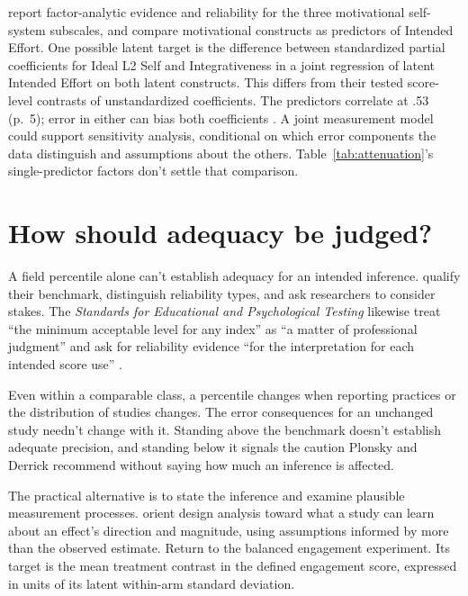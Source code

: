 \documentclass[12pt,twoside]{article}
\begin{document}
\textcite[pp.\ 4--6]{PapiSongSoliman2026} report factor-analytic evidence and reliability for the three motivational self-system subscales, and compare motivational constructs as predictors of Intended Effort. One possible latent target is the difference between standardized partial coefficients for Ideal L2 Self and Integrativeness in a joint regression of latent Intended Effort on both latent constructs. This differs from their tested score-level contrasts of unstandardized coefficients. The predictors correlate at .53 (p.\ 5); error in either can bias both coefficients \citep[p.\ 3]{WestfallYarkoni2016}. A joint measurement model could support sensitivity analysis, conditional on which error components the data distinguish and assumptions about the others. Table~\ref{tab:attenuation}'s single-predictor factors don't settle that comparison.

\section{How should adequacy be judged?}

A field percentile alone can't establish adequacy for an intended inference. \textcite[p.\ 548]{PlonskyDerrick2016} qualify their benchmark, distinguish reliability types, and ask researchers to consider stakes. The \textit{Standards for Educational and Psychological Testing} likewise treat \enquote{the minimum acceptable level for any index} as \enquote{a matter of professional judgment} and ask for reliability evidence \enquote{for the interpretation for each intended score use} \citep[pp.\ 41--42]{aera2014standards}.

Even within a comparable class, a percentile changes when reporting practices or the distribution of studies changes. The error consequences for an unchanged study needn't change with it. Standing above the benchmark doesn't establish adequate precision, and standing below it signals the caution Plonsky and Derrick recommend without saying how much an inference is affected.

The practical alternative is to state the inference and examine plausible measurement processes. \textcite[pp.\ 641--643]{gelman2014types} orient design analysis toward what a study can learn about an effect's direction and magnitude, using assumptions informed by more than the observed estimate. Return to the balanced engagement experiment. Its target is the mean treatment contrast in the defined engagement score, expressed in units of its latent within-arm standard deviation.
\end{document}

